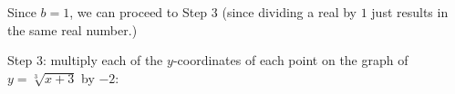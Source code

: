 \documentclass{ximera}
\begin{document}
\begin{example}
\begin{enumerate}





 
 
 Since $b=1$, we can proceed to Step 3 (since dividing a real by $1$ just results in the same real number.)
 
 Step 3:   multiply each of the $y$-coordinates of each point on the graph of $y = \sqrt[3]{x+3}$ by  $-2$:





\end{enumerate}
\end{example}
\end{document}
